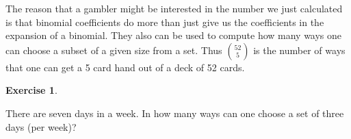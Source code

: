\documentclass[10pt,]{book}
\theoremstyle{plain}
\theoremstyle{definition}
\theoremstyle{definition}
\newtheorem{exercise}[theorem]{Exercise}
\numberwithin{equation}{section}
\begin{document}
      The reason that a gambler might be interested in the number we just calculated
      is that binomial coefficients do more than just give us the coefficients in the
      expansion of a binomial. They also can be used to compute how many ways one
      can choose a subset of a given size from a set. Thus \(\binom{52}{5}\) is the
      number of ways that one can get a 5 card hand out of a deck of 52 cards.
\begin{exercise}\label{exercise-5}

          There are seven days in a week. In how many ways can one choose a set
          of three days (per week)?
\end{exercise}
\typeout{************************************************}
\typeout{************************************************}
\end{document}
